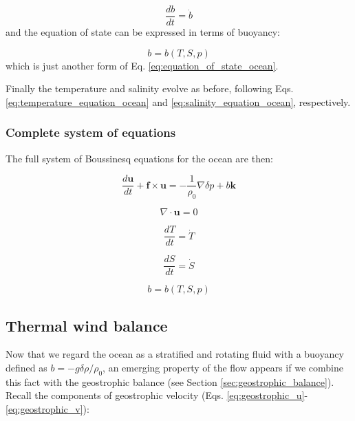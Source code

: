\documentclass[12pt]{article}
\numberwithin{equation}{section}
\numberwithin{figure}{section}
\numberwithin{table}{section}
\begin{document}
\begin{equation}
  \frac{d b}{dt} = \dot{b}
\end{equation}
and the equation of state can be expressed in terms of buoyancy:

\begin{equation}
  b = b(T, S, p)
\end{equation}
which is just another form of Eq. \ref{eq:equation_of_state_ocean}.

Finally the temperature and salinity evolve as before, following
Eqs. \ref{eq:temperature_equation_ocean} and \ref{eq:salinity_equation_ocean},
respectively.

\subsubsection{Complete system of equations}

The full system of Boussinesq equations for the ocean are then:

\begin{equation}
  \frac{d \mathbf{u}}{dt} + \mathbf{f} \times \mathbf{u} =
  - \frac{1}{\rho_0} \nabla \delta p + b \mathbf{k}
\end{equation}

\begin{equation}
  \nabla \cdot \mathbf{u} = 0
\end{equation}

\begin{equation}
  \frac{d T}{dt} = \dot{T}
\end{equation}

\begin{equation}
  \frac{d S}{dt} = \dot{S}
\end{equation}

\begin{equation}
  b = b(T, S, p)
\end{equation}

\subsection{Thermal wind balance}

Now that we regard the ocean as a stratified and rotating fluid with a buoyancy
defined as $b = - g \delta \rho / \rho_0$, an emerging property of the flow
appears if we combine this fact with the geostrophic balance
(see Section \ref{sec:geostrophic_balance}).
Recall the components of geostrophic velocity (Eqs. \ref{eq:geostrophic_u}-\ref{eq:geostrophic_v}):
\end{document}
